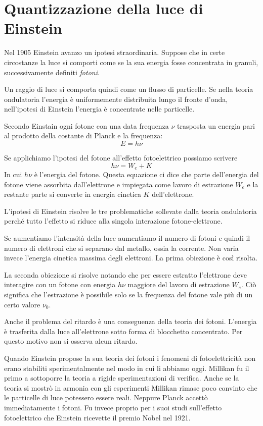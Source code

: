 \documentclass[12pt,twoside]{report}
\begin{document}
\section{Quantizzazione della luce di Einstein}
\par{Nel 1905 Einstein avanzo un ipotesi straordinaria. Suppose che in certe circostanze la luce si comporti come se la sua energia fosse concentrata in granuli, successivamente definiti \textit{fotoni}.}
\par{Un raggio di luce si comporta quindi come un flusso di particelle. Se nella teoria ondulatoria l'energia è uniformemente distribuita lungo il fronte d'onda, nell'ipotesi di Einstein l'energia è concentrate nelle particelle.}
\par{Secondo Einstain ogni fotone con una data frequenza $\nu$ trasposta un energia pari al prodotto della costante di Planck e la frequenza:}
$$ E = h\nu $$ 
\par{Se applichiamo l'ipotesi del fotone all'effetto fotoelettrico possiamo scrivere
$$ h\nu = W_e + K$$
In cui $h\nu$ è l'energia del fotone. Questa equazione ci dice che parte dell'energia del fotone viene assorbita dall'elettrone e impiegata come lavoro di estrazione $W_e$ e la restante parte si converte in energia cinetica $K$ dell'elettrone.}
\par{L'ipotesi di Einstein risolve le tre problematiche sollevate dalla teoria ondulatoria perché tutto l'effetto si riduce alla singola interazione fotone-elettrone.}
\par{Se aumentiamo l'intensità della luce aumentiamo il numero di fotoni e quindi il numero di elettroni che si separano dal metallo, ossia la corrente. Non varia invece l'energia cinetica massima degli elettroni. La prima obiezione è così risolta. }
\par{La seconda obiezione si risolve notando che per essere estratto l'elettrone deve interagire con un fotone con energia $h\nu$ maggiore del lavoro di estrazione $W_e$. Ciò significa che l'estrazione è possibile solo se la frequenza del fotone vale più di un certo valore $\nu_0$.}
\par{Anche il problema del ritardo è una conseguenza della teoria dei fotoni. L'energia è trasferita dalla luce all'elettrone sotto forma di blocchetto concentrato. Per questo motivo non si osserva alcun ritardo.}
\par{Quando Einstein propose la sua teoria dei fotoni i fenomeni di fotoelettricità non erano stabiliti sperimentalmente nel modo in cui li abbiamo oggi. Millikan fu il primo a sottoporre la teoria a rigide sperimentazioni di verifica. Anche se la teoria si mostrò in armonia con gli esperimenti Millikan rimase poco convinto che le particelle di luce potessero essere reali. Neppure Planck accettò immediatamente i fotoni. Fu invece proprio per i suoi studi sull'effetto fotoelettrico che Einstein ricevette il premio Nobel nel 1921.}
\end{document}
